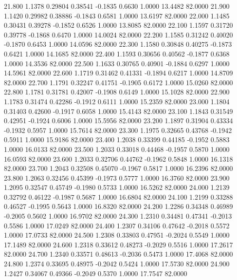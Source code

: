   21.800   1.1378   0.29804   0.38541  -0.1835   0.6630   1.0000  13.4482  82.0000
  21.900   1.1420   0.29982   0.38886  -0.1843   0.6581   1.0000  13.6197  82.0000
  22.000   1.1485   0.30431   0.39278  -0.1852   0.6526   1.0000  13.8085  82.0000
  22.100   1.1597   0.31720   0.39778  -0.1868   0.6470   1.0000  14.0024  82.0000
  22.200   1.1585   0.31242   0.40020  -0.1870   0.6453   1.0000  14.0596  82.0000
  22.300   1.1580   0.30848   0.40275  -0.1873   0.6421   1.0000  14.1685  82.0000
  22.400   1.1593   0.30656   0.40562  -0.1877   0.6368   1.0000  14.3536  82.0000
  22.500   1.1633   0.30765   0.40901  -0.1884   0.6297   1.0000  14.5961  82.0000
  22.600   1.1719   0.31462   0.41331  -0.1894   0.6217   1.0000  14.8709  82.0000
  22.700   1.1791   0.32247   0.41751  -0.1905   0.6172   1.0000  15.0260  82.0000
  22.800   1.1781   0.31781   0.42007  -0.1908   0.6149   1.0000  15.1028  82.0000
  22.900   1.1783   0.31474   0.42286  -0.1912   0.6111   1.0000  15.2359  82.0000
  23.000   1.1804   0.31403   0.42600  -0.1917   0.6058   1.0000  15.4143  82.0000
  23.100   1.1843   0.31549   0.42951  -0.1924   0.6006   1.0000  15.5956  82.0000
  23.200   1.1897   0.31904   0.43334  -0.1932   0.5957   1.0000  15.7614  82.0000
  23.300   1.1975   0.32665   0.43768  -0.1942   0.5911   1.0000  15.9186  82.0000
  23.400   1.2038   0.33399   0.44185  -0.1952   0.5883   1.0000  16.0133  82.0000
  23.500   1.2033   0.33018   0.44468  -0.1957   0.5870   1.0000  16.0593  82.0000
  23.600   1.2033   0.32706   0.44762  -0.1962   0.5848   1.0000  16.1318  82.0000
  23.700   1.2043   0.32508   0.45070  -0.1967   0.5817   1.0000  16.2396  82.0000
  23.800   1.2063   0.32456   0.45399  -0.1973   0.5777   1.0000  16.3760  82.0000
  23.900   1.2095   0.32547   0.45749  -0.1980   0.5733   1.0000  16.5262  82.0000
  24.000   1.2139   0.32792   0.46122  -0.1987   0.5687   1.0000  16.6804  82.0000
  24.100   1.2199   0.33288   0.46527  -0.1995   0.5643   1.0000  16.8320  82.0000
  24.200   1.2286   0.34348   0.46989  -0.2005   0.5602   1.0000  16.9702  82.0000
  24.300   1.2310   0.34481   0.47341  -0.2013   0.5586   1.0000  17.0249  82.0000
  24.400   1.2307   0.34106   0.47642  -0.2018   0.5572   1.0000  17.0733  82.0000
  24.500   1.2308   0.33803   0.47951  -0.2024   0.5549   1.0000  17.1489  82.0000
  24.600   1.2318   0.33612   0.48273  -0.2029   0.5516   1.0000  17.2617  82.0000
  24.700   1.2340   0.33571   0.48613  -0.2036   0.5473   1.0000  17.4068  82.0000
  24.800   1.2374   0.33695   0.48975  -0.2042   0.5424   1.0000  17.5730  82.0000
  24.900   1.2427   0.34067   0.49366  -0.2049   0.5370   1.0000  17.7547  82.0000
